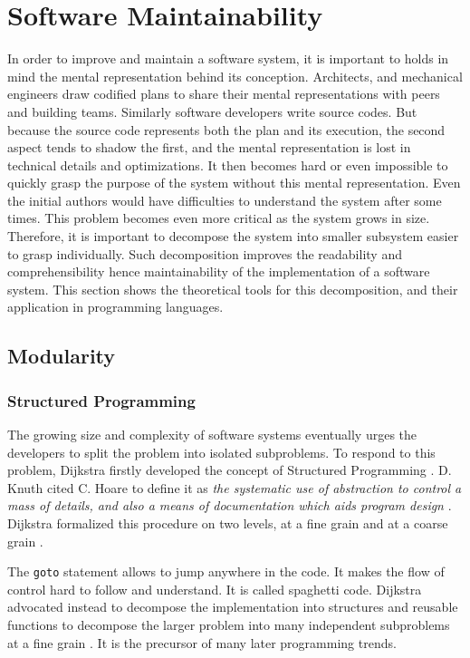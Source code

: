 \section{Software Maintainability} \label{chapter3:software-maintainability}

In order to improve and maintain a software system, it is important to holds in mind the mental representation behind its conception.
Architects, and mechanical engineers draw codified plans to share their mental representations with peers and building teams.
Similarly software developers write source codes.
But because the source code represents both the plan and its execution, the second aspect tends to shadow the first, and the mental representation is lost in technical details and optimizations.
It then becomes hard or even impossible to quickly grasp the purpose of the system without this mental representation.
Even the initial authors would have difficulties to understand the system after some times.
This problem becomes even more critical as the system grows in size.
Therefore, it is important to decompose the system into smaller subsystem easier to grasp individually.
Such decomposition improves the readability and comprehensibility hence maintainability of the implementation of a software system.
This section shows the theoretical tools for this decomposition, and their application in programming languages.

\subsection{Modularity}

\subsubsection{Structured Programming}


The growing size and complexity of software systems eventually urges the developers to split the problem into isolated subproblems.
To respond to this problem, Dijkstra firstly developed the concept of Structured Programming \cite{Dijkstra1970}.
D. Knuth cited C. Hoare to define it as \textit{the systematic use of abstraction to control a mass of details, and also a means of documentation which aids program design} \cite{Knuth1974}.
Dijkstra formalized this procedure on two levels, at a fine grain and at a coarse grain \cite{Dijkstra1968a,Dijkstra1968}.

The \texttt{goto} statement allows to jump anywhere in the code.
It makes the flow of control hard to follow and understand.
It is called spaghetti code.
Dijkstra advocated instead to decompose the implementation into structures and reusable functions to decompose the larger problem into many independent subproblems at a fine grain \cite{Dijkstra1968a}.
It is the precursor of many later programming trends.

